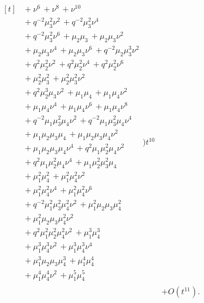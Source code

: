 \documentclass[10pt]{article}
\begin{document}
\[\begin{aligned}
\begin{aligned}[t]
  &{}+\nu^{6}\,+\nu^{8}\,+\nu^{10} \\
  &{}+q^{-2}\mu_3^{2}\nu^{2}\,+q^{-2}\mu_3^{2}\nu^{4} \\
  &{}+q^{-2}\mu_3^{2}\nu^{6}\,+\mu_2\mu_3\,+\mu_2\mu_3\nu^{2} \\
  &{}+\mu_2\mu_3\nu^{4}\,+\mu_2\mu_3\nu^{6}\,+q^{-2}\mu_2\mu_3^{3}\nu^{2} \\
  &{}+q^{2}\mu_2^{2}\nu^{2}\,+q^{2}\mu_2^{2}\nu^{4}\,+q^{2}\mu_2^{2}\nu^{6} \\
  &{}+\mu_2^{2}\mu_3^{2}\,+\mu_2^{2}\mu_3^{2}\nu^{2} \\
  &{}+q^{2}\mu_2^{3}\mu_3\nu^{2}\,+\mu_1\mu_4\,+\mu_1\mu_4\nu^{2} \\
  &{}+\mu_1\mu_4\nu^{4}\,+\mu_1\mu_4\nu^{6}\,+\mu_1\mu_4\nu^{8} \\
  &{}+q^{-2}\mu_1\mu_3^{2}\mu_4\nu^{2}\,+q^{-2}\mu_1\mu_3^{2}\mu_4\nu^{4} \\
  &{}+\mu_1\mu_2\mu_3\mu_4\,+\mu_1\mu_2\mu_3\mu_4\nu^{2} \\
  &{}+\mu_1\mu_2\mu_3\mu_4\nu^{4}\,+q^{2}\mu_1\mu_2^{2}\mu_4\nu^{2} \\
  &{}+q^{2}\mu_1\mu_2^{2}\mu_4\nu^{4}\,+\mu_1\mu_2^{2}\mu_3^{2}\mu_4 \\
  &{}+\mu_1^{2}\mu_4^{2}\,+\mu_1^{2}\mu_4^{2}\nu^{2} \\
  &{}+\mu_1^{2}\mu_4^{2}\nu^{4}\,+\mu_1^{2}\mu_4^{2}\nu^{6} \\
  &{}+q^{-2}\mu_1^{2}\mu_3^{2}\mu_4^{2}\nu^{2}\,+\mu_1^{2}\mu_2\mu_3\mu_4^{2} \\
  &{}+\mu_1^{2}\mu_2\mu_3\mu_4^{2}\nu^{2} \\
  &{}+q^{2}\mu_1^{2}\mu_2^{2}\mu_4^{2}\nu^{2}\,+\mu_1^{3}\mu_4^{3} \\
  &{}+\mu_1^{3}\mu_4^{3}\nu^{2}\,+\mu_1^{3}\mu_4^{3}\nu^{4} \\
  &{}+\mu_1^{3}\mu_2\mu_3\mu_4^{3}\,+\mu_1^{4}\mu_4^{4} \\
  &{}+\mu_1^{4}\mu_4^{4}\nu^{2}\,+\mu_1^{5}\mu_4^{5}\end{aligned}\Bigr)t^{10} \\
  &+ O(t^{11}).
\end{aligned}
\]
\end{document}
